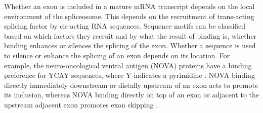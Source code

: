 Whether an exon is included in a mature mRNA transcript depends on the local environment of the spliceosome.
This depends on the recruitment of trans-acting splicing factor by cis-acting RNA sequences.
Sequence motifs can be classified based on which factors they recruit and by what the result of binding is, whether binding enhances or silences the splicing of the exon.
Whether a sequence is used to silence or enhance the splicing of an exon depends on its location.
For example, the neuro-oncological ventral antigen (NOVA) proteins have a binding preference for YCAY sequences, where Y indicates a pyrimidine \citep{Buckanovich1996,Jensen2000}.
NOVA binding directly immediately downstream or distally upstream of an exon acts to promote its inclusion, whereas NOVA binding directly on top of an exon or adjacent to the upstream adjacent exon promotes exon skipping \citep{Ule2006}.












%

%
%
%




%


